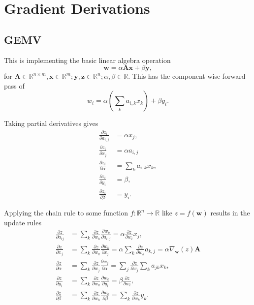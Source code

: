 \documentclass{article}
\newcommand{\mat}[1]{\bm{{#1}}}
\renewcommand{\vec}[1]{\bm{{#1}}}
\newcommand{\grad}{\nabla}
\theoremstyle{definition}
\begin{document}
\section{Gradient Derivations}
\subsection{GEMV}
This is implementing the basic linear algebra operation
\begin{equation}
  \vec{w} = \alpha \mat{A}\vec{x} + \beta \vec{y},
\end{equation}
for $\mat{A} \in \mathbb{R}^{n \times m}, \vec{x} \in \mathbb{R}^m; \vec{y}, \vec{z} \in \mathbb{R}^n; \alpha, \beta \in \mathbb{R}$.  This has the component-wise forward pass of
\begin{equation}
  w_i = \alpha\left(\sum_k a_{i,k} x_k\right) + \beta y_i.
\end{equation}

Taking partial derivatives gives
\begin{align}
  \frac{\partial z_i}{\partial a_{i,j}} &= \alpha x_j, \\
  \frac{\partial z_i}{\partial x_j} &= \alpha a_{i, j} \\
  \frac{\partial z_i}{\partial \alpha} &= \sum_k a_{i,k} x_k, \\
  \frac{\partial z_i}{\partial y_i} &= \beta, \\
  \frac{\partial z_i}{\partial \beta} &= y_i.
\end{align}

Applying the chain rule to some function $f : \mathbb{R}^n \to \mathbb{R}$ like $z=f\left(\vec{w}\right)$ results in the update rules
\begin{align}
  \frac{\partial z}{\partial a_{ij}} &= \sum_k \frac{\partial z}{\partial w_k} \frac{\partial w_k}{\partial a_{i,j}} = \alpha \frac{\partial z}{\partial w_i} x_j, \\
  \frac{\partial z}{\partial x_j} &= \sum_k \frac{\partial z}{\partial w_k} \frac{\partial w_k}{\partial x_j} = \alpha \sum_k \frac{\partial z}{\partial w_k} a_{k, j} = \alpha \grad_{\vec{w}}\left(z\right) \mat{A} \\
  \frac{\partial z}{\partial \alpha} &= \sum_k \frac{\partial z}{\partial w_j} \frac{\partial w_j}{\partial \alpha} = \sum_j \frac{\partial z}{\partial w_j} \sum_k a_{jk} x_k, \\
  \frac{\partial z}{\partial y_i} &= \sum_k \frac{\partial z}{\partial w_k} \frac{\partial w_k}{\partial y_i} = \beta \frac{\partial z}{\partial w_i}, \\
  \frac{\partial z}{\partial \beta} &= \sum_k \frac{\partial z}{\partial w_k} \frac{\partial w_k}{\partial \beta} = \sum_k \frac{\partial z}{\partial w_k} y_k.
\end{align}
\end{document}
